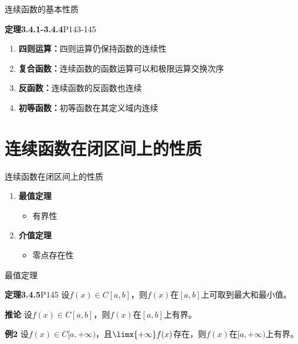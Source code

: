 \begin{frame}{连续函数的基本性质}
	\linespread{1.5}\pause 
	\begin{block}{{\bf 定理3.4.1-3.4.4}\hfill P143-145}\pause 
		\begin{enumerate}
		  \item {\bf 四则运算：}\pause 四则运算仍保持函数的连续性\pause 
		  \item {\bf 复合函数：}\pause 连续函数的函数运算可以和极限运算交换次序\pause 
		  \item {\bf 反函数：}\pause 连续函数的反函数也连续\pause 
		  \item {\bf 初等函数：}\pause 初等函数在其定义域内连续
		\end{enumerate}
	\end{block}
\end{frame}

\section{连续函数在闭区间上的性质}

\begin{frame}{连续函数在闭区间上的性质}
	\linespread{2}\pause 
	\begin{enumerate}
	  \item {\bf 最值定理}\pause 
	  \begin{itemize}
	    \item 有界性\pause 
	  \end{itemize}
	  \item {\bf 介值定理}\pause 
	  \begin{itemize}
	    \item 零点存在性
	  \end{itemize}
	\end{enumerate}
\end{frame}

\begin{frame}{最值定理}
	\linespread{1.2}\pause 
	\begin{block}{{\bf 定理3.4.5}\hfill P145}
		设$f(x)\in C[a,b]$，则$f(x)$在$[a,b]$上可取到最大和最小值。
	\end{block}\pause 
	\begin{block}{{\bf 推论}\hfill}
		设$f(x)\in C[a,b]$，则$f(x)$在$[a,b]$上有界。
	\end{block}\pause 
	\begin{exampleblock}{{\bf 例2}\hfill}
		设$f(x)\in C[a,+\infty)$，且$\limx{+\infty}f(x)$存在，则$f(x)$在$[a,+\infty)$上有界。
	\end{exampleblock}
\end{frame}

